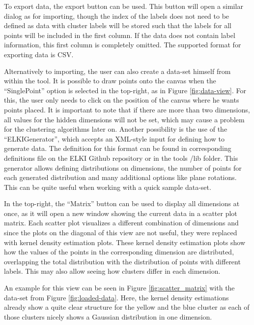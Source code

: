 \documentclass[
	a4paper,
	english,
	twoside,
	openright,               
	11pt                            
	]{report}
\begin{document}
To export data, the export button can be used. This button will open a similar dialog as for importing, though the index of the labels does not need to be defined as data with cluster labels will be stored such that the labels for all points will be included in the first column. If the data does not contain label information, this first column is completely omitted. The supported format for exporting data is CSV.

Alternatively to importing, the user can also create a data-set himself from within the tool. It is possible to draw points onto the canvas when the ``SinglePoint'' option is selected in the top-right, as in Figure \ref{fig:data-view}. For this, the user only needs to click on the position of the canvas where he wants points placed. It is important to note that if there are more than two dimensions, all values for the hidden dimensions will not be set, which may cause a problem for the clustering algorithms later on. Another possibility is the use of the ``ELKIGenerator'', which accepts an XML-style input for defining how to generate data. The definition for this format can be found in corresponding definitions file on the ELKI Github repository \cite{elkixml} or in the tools /lib folder. This generator allows defining distributions on dimensions, the number of points for each generated distribution and many additional options like plane rotations. This can be quite useful when working with a quick sample data-set. 

In the top-right, the ``Matrix'' button can be used to display all dimensions at once, as it will open a new window showing the current data in a scatter plot matrix. Each scatter plot visualizes a different combination of dimensions and since the plots on the diagonal of this view are not useful, they were replaced with kernel density estimation plots. These kernel density estimation plots show how the values of the points in the corresponding dimension are distributed, overlapping the total distribution with the distribution of points with different labels. This may also allow seeing how clusters differ in each dimension. 

An example for this view can be seen in Figure \ref{fig:scatter_matrix} with the data-set from Figure \ref{fig:loaded-data}. Here, the kernel density estimations already show a quite clear structure for the yellow and the blue cluster as each of those clusters nicely shows a Gaussian distribution in one dimension.
\end{document}
